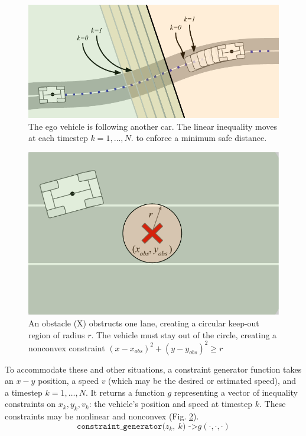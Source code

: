 \documentclass[letterpaper, 10 pt, conference]{ieeeconf}  %
\begin{document}
\begin{figure}[h]
	\centering
	\includegraphics[width=0.9\linewidth]{figures/following.pdf}
	\caption{The ego vehicle is following another car. The linear inequality moves at each timestep $k=1,\dots,N$. to enforce a minimum safe distance.}
	\label{fig:vehicle_in_front}
\end{figure}

\begin{figure}[h]
	\centering
	\includegraphics[width=0.8\linewidth]{figures/obstacle_in_road.pdf}
	\caption{An obstacle (X) obstructs one lane, creating a circular keep-out region of radius $r$. The vehicle must stay out of the circle, creating a nonconvex constraint $(x-x_{obs})^2 + (y-y_{obs})^2 \geq r$}
	\label{fig:obstacle}
\end{figure}


To accommodate these and other situations, a constraint generator function takes an $x-y$ position, a speed $v$ (which may be the desired or estimated speed), and a timestep $k=1,\dots,N$. It returns a function $g$ representing a vector of inequality constraints on $x_k, y_k, v_k$: the vehicle's position and speed at timestep $k$. These constraints may be nonlinear and nonconvex (Fig. \ref{fig:obstacle}).
%
$$\texttt{constraint\_generator($z_k,\ k$) ->} g(\cdot, \cdot, \cdot)$$
\end{document}
